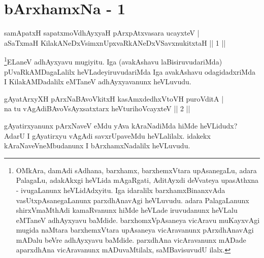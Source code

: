 

\chapter{bArxhamxNa - 1}

\begin{shl}
samApatxH sapatxmoV\s dhAyxyaH pArxpAtxvasara ucayxteV | \\
aSaTxmaH KilakANeDxV\s simxnUpxvaRkANeDxVSavxnukitxtaH \hfill|| 1 || 
\end{shl}

\begin{artha} 
\footnote[1]{OMkAra, damAdi sAdhana, barxhamx, barxhemxVtara 
upAsanegaLu, adara PalagaLu, adakAkxgi heVLida mAgaRgati, AditAyxdi 
deVvateya upasAthxna - ivugaLanunx heVLidAdxyitu. Iga idaralilx 
barxhamxBinanxvAda vasUtxpAsanegaLanunx parxdhAnavAgi heVLuvudu. adara 
PalagaLanunx shirxVmaMthAdi kamaRvanunx hiMde heVLade iruvudanunx heVLalu 
eMTaneV adhAyxyavu baMdide. barxhomxVpAsaneya vicAravu muKayxvAgi 
mugida naMtara barxhemxVtara upAsaneya vicAravanunx pArxdhAnavAgi 
mADalu beVre adhAyxyavu baMdide. parxdhAna vicAravanunx mADade 
aparxdhAna vicAravanunx mADuvaMtilalx, saMBavisuvudU ilalx.}ELaneV adhAyxyavu mugiyitu. Iga (avakAshavu 
laBisiruvudariMda) pUvaRkAMDagaLalilx heVLadeyiruvudariMda Iga 
avakAshavu odagidadxriMda I KilakAMDadalilx eMTaneV adhAyxyavanunx 
heVLuvudu.
\end{artha}


\begin{shl}
gAyatArxyXH pArxNaBAvoVkitxH kasAmxdedhxVtoVH puroVditA | \\
na tu vAgAdiBAvoV\s sAyxsatxtarx heVturihoVcayxteV \hfill|| 2 || 
\end{shl}

\begin{artha} 
gAyatirxyanunx pArxNaveV eMdu yAva kAraNadiMda hiMde heVLidudx? AdarU 
I gAyatirxyu vAgAdi savxrUpaveMdu heVLalilalx. idakekx 
kAraNaveVneMbudanunx I bArxhamxNadalilx heVLuvudu.
\end{artha}

